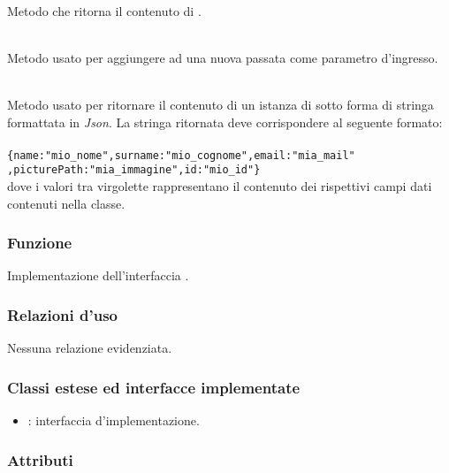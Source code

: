 \begin{description}
	\item{}\\
	Metodo che ritorna il contenuto di .
	\item{}\\
	Metodo usato per aggiungere ad  una nuova  passata come parametro d'ingresso.
	\item{}\\
	Metodo usato per ritornare il contenuto di un istanza di  sotto forma di stringa formattata in \textit{Json}. La stringa ritornata deve corrispondere al seguente formato:\\\\
	\verb|{name:"mio_nome",surname:"mio_cognome",email:"mia_mail"|\\\verb|,picturePath:"mia_immagine",id:"mio_id"}|\\
	
	dove i valori tra virgolette rappresentano il contenuto dei rispettivi campi dati contenuti nella classe.
\end{description}


\subsubsection*{Funzione}
Implementazione dell'interfaccia .

\subsubsection*{Relazioni d'uso}

Nessuna relazione evidenziata.

\subsubsection*{Classi estese ed interfacce implementate}
\begin{itemize}
	\item {}: interfaccia d'implementazione.
\end{itemize}


\subsubsection*{Attributi}


